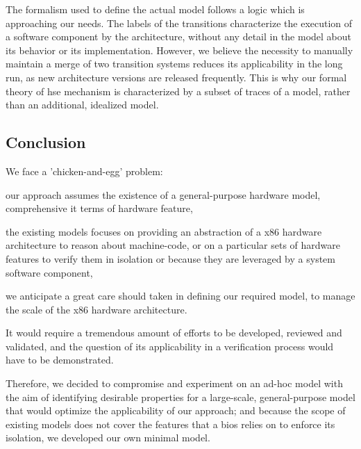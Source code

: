 %
The formalism used to define the actual model follows a logic which is
approaching our needs.
%
The labels of the transitions characterize the execution of a software component
by the architecture, without any detail in the model about its behavior or its
implementation.
%
However, we believe the necessity to manually maintain a merge of two transition
systems reduces its applicability in the long run, as new architecture versions
are released frequently.
%
This is why our formal theory of \ac{hse} mechanism is characterized by a
subset of traces of a model, rather than an additional, idealized model.
%

\subsection{Conclusion}
\label{subsec:sota:ltsconclusion}

We face a 'chicken-and-egg' problem:
%
\begin{inparaenum}[(1)]
\item our approach assumes the existence of a general-purpose hardware model,
  comprehensive it terms of hardware feature,
\item the existing models focuses on providing an abstraction of a x86 hardware
  architecture to reason about machine-code, or on a particular sets of hardware
  features to verify them in isolation or because they are leveraged by a system
  software component,
\item we anticipate a great care should taken in defining our required model, to
  manage the scale of the x86 hardware architecture.
\end{inparaenum}
%
It would require a tremendous amount of efforts to be developed, reviewed and
validated, and the question of its applicability in a verification process would
have to be demonstrated.

Therefore, we decided to compromise and experiment on an ad-hoc model with the
aim of identifying desirable properties for a large-scale, general-purpose model
that would optimize the applicability of our approach; and because the scope of
existing models does not cover the features that a \ac{bios} relies on to
enforce its isolation, we developed our own minimal model.
%
%

